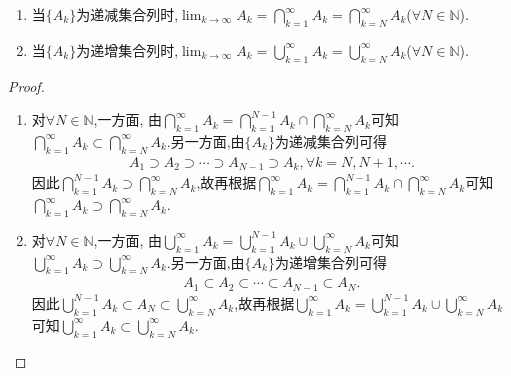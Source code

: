 \documentclass[../../main.tex]{subfiles}
\begin{document}
\begin{proposition}\label{proposition:单调集合上下限的一般形式}
\begin{enumerate}
\item 当$\{A_k\}$为递减集合列时,$\lim_{k\to \infty}A_k=\bigcap_{k=1}^{\infty}A_k=\bigcap_{k=N}^{\infty}A_k$($\forall N\in \mathbb{N}$).

\item 当$\{A_k\}$为递增集合列时,$\lim_{k\to \infty}A_k=\bigcup_{k=1}^{\infty}A_k=\bigcup_{k=N}^{\infty}A_k$($\forall N\in \mathbb{N}$).
\end{enumerate}

\end{proposition}
\begin{proof}
\begin{enumerate}
\item 对$\forall N\in \mathbb{N}$,一方面,
由$\bigcap_{k=1}^{\infty}{A_k}=\bigcap_{k=1}^{N-1}{A_k}\cap \bigcap_{k=N}^{\infty}{A_k}$可知$\bigcap_{k=1}^{\infty}{A_k}\subset \bigcap_{k=N}^{\infty}{A_k}$.另一方面,由$\{A_k\}$为递减集合列可得
\begin{align*}
A_1\supset A_2\supset \cdots \supset A_{N-1}\supset A_k,\forall k=N,N+1,\cdots .
\end{align*}
因此$\bigcap_{k=1}^{N-1}{A_k}\supset \bigcap_{k=N}^{\infty}{A_k}$,故再根据$\bigcap_{k=1}^{\infty}{A_k}=\bigcap_{k=1}^{N-1}{A_k}\cap \bigcap_{k=N}^{\infty}{A_k}$可知$\bigcap_{k=1}^{\infty}{A_k}\supset \bigcap_{k=N}^{\infty}{A_k}$.

\item 对$\forall N\in \mathbb{N}$,一方面,
由$\bigcup_{k=1}^{\infty}{A_k}=\bigcup_{k=1}^{N-1}{A_k}\cup \bigcup_{k=N}^{\infty}{A_k}$可知$\bigcup_{k=1}^{\infty}{A_k}\supset \bigcup_{k=N}^{\infty}{A_k}$.另一方面,由$\{A_k\}$为递增集合列可得
\begin{align*}
A_1\subset A_2\subset \cdots \subset A_{N-1}\subset A_N.
\end{align*}
因此$\bigcup_{k=1}^{N-1}{A_k}\subset A_N \subset \bigcup_{k=N}^{\infty}{A_k}$,故再根据$\bigcup_{k=1}^{\infty}{A_k}=\bigcup_{k=1}^{N-1}{A_k}\cup \bigcup_{k=N}^{\infty}{A_k}$可知$\bigcup_{k=1}^{\infty}{A_k}\subset \bigcup_{k=N}^{\infty}{A_k}$.
\end{enumerate}

\end{proof}
\end{document}
